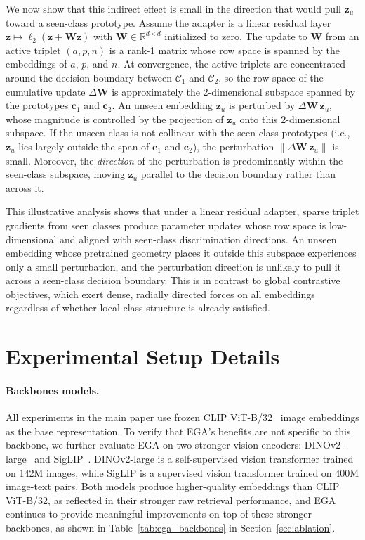 \documentclass{article}
\begin{document}
We now show that this indirect effect is small in the direction that would pull $\mathbf{z}_u$ toward a seen-class prototype.
Assume the adapter is a linear residual layer $\mathbf{z} \mapsto \ell_2(\mathbf{z} + \mathbf{W}\mathbf{z})$ with $\mathbf{W} \in \mathbb{R}^{d \times d}$ initialized to zero.
The update to $\mathbf{W}$ from an active triplet $(a,p,n)$ is a rank-1 matrix whose row space is spanned by the embeddings of $a$, $p$, and $n$.
At convergence, the active triplets are concentrated around the decision boundary between $\mathcal{C}_1$ and $\mathcal{C}_2$, so the row space of the cumulative update $\Delta\mathbf{W}$ is approximately the 2-dimensional subspace spanned by the prototypes $\mathbf{c}_1$ and $\mathbf{c}_2$.
An unseen embedding $\mathbf{z}_u$ is perturbed by $\Delta\mathbf{W}\,\mathbf{z}_u$, whose magnitude is controlled by the projection of $\mathbf{z}_u$ onto this 2-dimensional subspace.
If the unseen class is not collinear with the seen-class prototypes (i.e., $\mathbf{z}_u$ lies largely outside the span of $\mathbf{c}_1$ and $\mathbf{c}_2$), the perturbation $\|\Delta\mathbf{W}\,\mathbf{z}_u\|$ is small.
Moreover, the \emph{direction} of the perturbation is predominantly within the seen-class subspace, moving $\mathbf{z}_u$ parallel to the decision boundary rather than across it.

This illustrative analysis shows that under a linear residual adapter, sparse triplet gradients from seen classes produce parameter updates whose row space is low-dimensional and aligned with seen-class discrimination directions.
An unseen embedding whose pretrained geometry places it outside this subspace experiences only a small perturbation, and the perturbation direction is unlikely to pull it across a seen-class decision boundary.
This is in contrast to global contrastive objectives, which exert dense, radially directed forces on all embeddings regardless of whether local class structure is already satisfied.

\section{Experimental Setup Details}
\label{sec:more_experiments}

\paragraph{Backbones models.}
All experiments in the main paper use frozen CLIP ViT-B/32~\cite{clip_icml21} image embeddings as the base representation.
To verify that EGA's benefits are not specific to this backbone, we further evaluate EGA on two stronger vision encoders: DINOv2-large~\cite{oquab2024dinov} and SigLIP~\cite{10377550}.
DINOv2-large is a self-supervised vision transformer trained on 142M images, while SigLIP is a supervised vision transformer trained on 400M image-text pairs.
Both models produce higher-quality embeddings than CLIP ViT-B/32, as reflected in their stronger raw retrieval performance, and EGA continues to provide meaningful improvements on top of these stronger backbones, as shown in Table~\ref{tab:ega_backbones} in Section~\ref{sec:ablation}.
\end{document}
